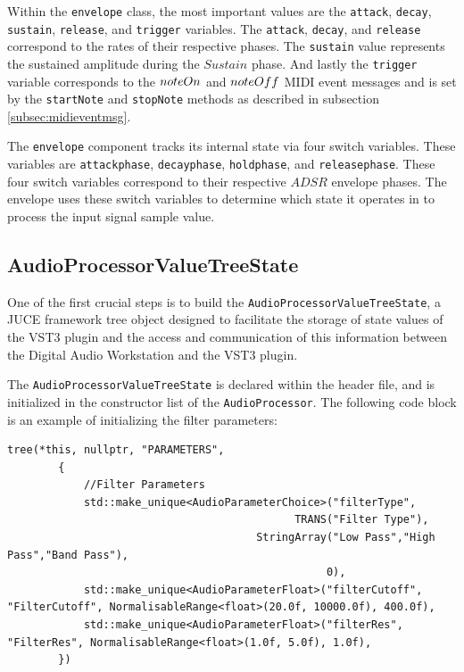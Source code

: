 \documentclass[a4paper,12pt]{report}
\begin{document}
Within the \texttt{envelope} class, the most important values are the \texttt{attack}, \texttt{decay}, \texttt{sustain}, \texttt{release}, and \texttt{trigger} variables. The \texttt{attack}, \texttt{decay}, and \texttt{release} correspond to the rates of their respective phases. The \texttt{sustain} value represents the sustained amplitude during the $Sustain$ phase. And lastly the \texttt{trigger} variable corresponds to the $note\-On$ and $note\-Off$ MIDI event messages and is set by the \texttt{start\-Note} and \texttt{stop\-Note} methods as described in subsection \ref{subsec:midieventmsg}.

The \texttt{envelope} component tracks its internal state via four switch variables. These variables are \texttt{attack\-phase}, \texttt{decay\-phase}, \texttt{hold\-phase}, and \texttt{release\-phase}. These four switch variables correspond to their respective $ADSR$ envelope phases. The envelope uses these switch variables to determine which state it operates in to process the input signal sample value. 

\subsection{AudioProcessorValueTreeState}
\label{subsec:apvt}
One of the first crucial steps is to build the \texttt{Audio\-Processor\-Value\-Tree\-State}, a JUCE framework tree object designed to facilitate the storage of state values of the VST3 plugin and the access and communication of this information between the Digital Audio Workstation and the VST3 plugin.

The \texttt{Audio\-Processor\-Value\-Tree\-State} is declared within the header file, and is initialized in the constructor list of the \texttt{Audio\-Processor}. The following code block is an example of initializing the filter parameters:


 \noindent\begin{minipage}{\linewidth} \begin{lstlisting}[caption={Initializing Filter Parameters},label={code:initfilterparam},captionpos=b]
tree(*this, nullptr, "PARAMETERS",
        {   
            //Filter Parameters
            std::make_unique<AudioParameterChoice>("filterType",
                                             TRANS("Filter Type"),
                                       StringArray("Low Pass","High Pass","Band Pass"),
                                                  0),
            std::make_unique<AudioParameterFloat>("filterCutoff", "FilterCutoff", NormalisableRange<float>(20.0f, 10000.0f), 400.0f),
            std::make_unique<AudioParameterFloat>("filterRes", "FilterRes", NormalisableRange<float>(1.0f, 5.0f), 1.0f),
        })
\end{lstlisting} \end{minipage}
\end{document}
